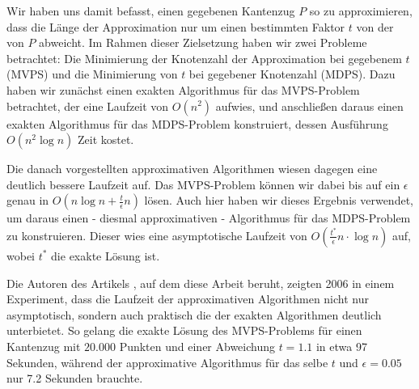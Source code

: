 Wir haben uns damit befasst, einen gegebenen Kantenzug $P$ so zu approximieren, dass die Länge der Approximation nur um einen bestimmten Faktor $t$ von der von $P$ abweicht. 
Im Rahmen dieser Zielsetzung haben wir zwei Probleme betrachtet: Die Minimierung der Knotenzahl der Approximation bei gegebenem $t$ (MVPS) und die Minimierung von $t$ bei gegebener Knotenzahl (MDPS).
Dazu haben wir zunächst einen exakten Algorithmus für das MVPS-Problem betrachtet, der eine Laufzeit von $O(n^2)$ aufwies, und anschließen daraus einen exakten Algorithmus für das MDPS-Problem konstruiert, dessen Ausführung $O(n^2 \log n)$ Zeit kostet.

Die danach vorgestellten approximativen Algorithmen wiesen dagegen eine deutlich bessere Laufzeit auf.
Das MVPS-Problem können wir dabei bis auf ein $\epsilon$ genau in $O(n \log n + \frac{t}{\epsilon}n)$ lösen.
Auch hier haben wir dieses Ergebnis verwendet, um daraus einen - diesmal approximativen - Algorithmus für das MDPS-Problem zu konstruieren. Dieser wies eine asymptotische Laufzeit von $O(\frac{t^*}{\epsilon}n \cdot \log n)$ auf, wobei $t^*$ die exakte Lösung ist.

Die Autoren des Artikels \cite{gudmundsson}, auf dem diese Arbeit beruht, zeigten 2006 in einem Experiment, dass die Laufzeit der approximativen Algorithmen nicht nur asymptotisch, sondern auch praktisch die der exakten Algorithmen deutlich unterbietet.
So gelang die exakte Lösung des MVPS-Problems für einen Kantenzug mit $20.000$ Punkten und einer Abweichung $t = 1.1$ in etwa 97 Sekunden, während der approximative Algorithmus für das selbe $t$ und $\epsilon = 0.05$ nur 7.2 Sekunden brauchte.